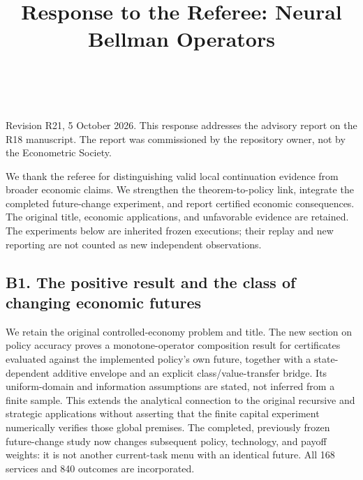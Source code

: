 \documentclass[ecta,nameyear,draft]{econsocart}
\theoremstyle{definition}
\theoremstyle{remark}
\begin{document}
\begin{frontmatter}

\title{Response to the Referee: Neural Bellman Operators}


\begin{aug}

\author[id=au1,addressref={add1}]{~}

\address[id=add1]{Peking University}

\end{aug}

\end{frontmatter}

\noindent Revision R21, 5 October 2026. This response addresses the advisory report on the R18 manuscript. The report was commissioned by the repository owner, not by the Econometric Society.

\par We thank the referee for distinguishing valid local continuation evidence from broader economic claims. We strengthen the theorem-to-policy link, integrate the completed future-change experiment, and report certified economic consequences. The original title, economic applications, and unfavorable evidence are retained. The experiments below are inherited frozen executions; their replay and new reporting are not counted as new independent observations.

\subsection*{B1. The positive result and the class of changing economic futures}

We retain the original controlled-economy problem and title. The new section on policy accuracy proves a monotone-operator composition result for certificates evaluated against the implemented policy's own future, together with a state-dependent additive envelope and an explicit class/value-transfer bridge. Its uniform-domain and information assumptions are stated, not inferred from a finite sample. This extends the analytical connection to the original recursive and strategic applications without asserting that the finite capital experiment numerically verifies those global premises. The completed, previously frozen future-change study now changes subsequent policy, technology, and payoff weights: it is not another current-task menu with an identical future. All 168 services and 840 outcomes are incorporated.
\end{document}
